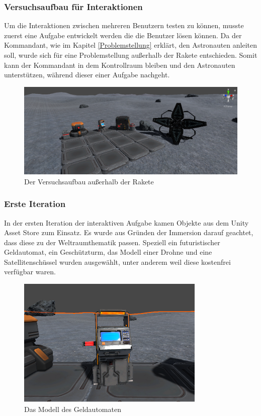 \subsubsection{Versuchsaufbau für Interaktionen} \label{Versuchsaufbau}
Um die Interaktionen zwischen mehreren Benutzern testen zu können, musste zuerst eine Aufgabe entwickelt werden die die Benutzer lösen können. Da der Kommandant, wie im Kapitel \ref{Problemstellung} erklärt, den Astronauten anleiten soll, wurde sich für eine Problemstellung außerhalb der Rakete entschieden. Somit kann der Kommandant in dem Kontrollraum bleiben und den Astronauten unterstützen, während dieser einer Aufgabe nachgeht.

\begin{figure}[H]
\centering
\includegraphics[width=1\textwidth]{InteraktionStation.PNG}
\caption{Der Versuchsaufbau außerhalb der Rakete}
\end{figure}

\subsubsection*{Erste Iteration}
In der ersten Iteration der interaktiven Aufgabe kamen Objekte aus dem Unity Asset Store zum Einsatz. Es wurde aus Gründen der Immersion darauf geachtet, dass diese zu der Weltraumthematik passen. Speziell ein futuristischer Geldautomat, ein Geschützturm, das Modell einer Drohne und eine Satellitenschüssel wurden ausgewählt, unter anderem weil diese kostenfrei verfügbar waren. 

\begin{figure}[H]
\centering
\includegraphics[width=0.8\textwidth]{ATM.PNG}
\caption{Das Modell des Geldautomaten}
\label{fig:ATM}
\end{figure}

